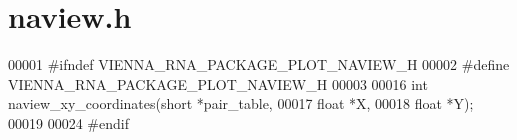 \hypertarget{plotting_2naview_8h_source}{}\section{naview.\+h}
\label{plotting_2naview_8h_source}

\begin{DoxyCode}
00001 \textcolor{preprocessor}{#ifndef VIENNA\_RNA\_PACKAGE\_PLOT\_NAVIEW\_H}
00002 \textcolor{preprocessor}{#define VIENNA\_RNA\_PACKAGE\_PLOT\_NAVIEW\_H}
00003 
00016 \textcolor{keywordtype}{int} naview\_xy\_coordinates(\textcolor{keywordtype}{short} *pair\_table,
00017                           \textcolor{keywordtype}{float} *X,
00018                           \textcolor{keywordtype}{float} *Y);
00019 
00024 \textcolor{preprocessor}{#endif}
\end{DoxyCode}
